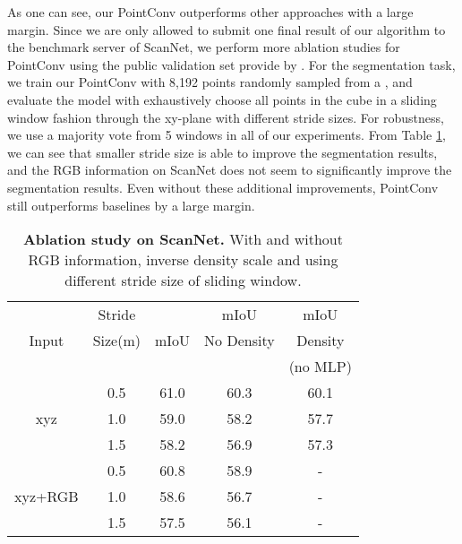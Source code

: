 \documentclass[10pt,twocolumn,letterpaper]{article}
\begin{document}
As one can see, our PointConv outperforms other approaches with a large margin. Since we are only allowed to submit one final result of our algorithm to the benchmark server of ScanNet, we perform more ablation studies for PointConv using the public validation set provide by \cite{dai2017scannet}. For the segmentation task, we train our PointConv with 8,192 points randomly sampled from a , and evaluate the model with exhaustively choose all points in the  cube in a sliding window fashion through the xy-plane with different stride sizes. For robustness, we use a majority vote from 5 windows in all of our experiments. From Table \ref{table:eval_stride}, we can see that smaller stride size is able to improve the segmentation results, and the RGB information on ScanNet does not seem to significantly improve the segmentation results. Even without these additional improvements, PointConv still outperforms baselines by a large margin.
\vspace{-0.05in}

\setlength{\tabcolsep}{4pt}
\begin{table}[htb]
	\begin{center}
		\caption{\textbf{Ablation study on ScanNet.} With and without RGB information, inverse density scale and using different stride size of sliding window.}
		\label{table:eval_stride}
		\begin{tabular*}{0.45\textwidth}{c|c|c|c|c}
			\hline
			  & Stride   &  & mIoU & mIoU\\
			Input & Size(m) & mIoU & No Density & Density \\
			  &   & &   & (no MLP) \\
			\hline
			\multirow{3}{*}{xyz} & 0.5 & 61.0 & 60.3 & 60.1\\
                                 & 1.0 & 59.0 & 58.2 & 57.7\\
                                 & 1.5 & 58.2 & 56.9 & 57.3\\
			\hline
            \multirow{3}{*}{xyz+RGB} & 0.5 & 60.8 & 58.9 & -\\
                                 & 1.0 & 58.6 & 56.7 & -\\
                                 & 1.5 & 57.5 & 56.1 & -\\
			\hline
		\end{tabular*}
	\end{center}
\vspace{-0.25in}
\end{table}
\setlength{\tabcolsep}{1.4pt}
\end{document}
